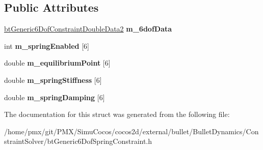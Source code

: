 \subsection*{Public Attributes}
\begin{DoxyCompactItemize}
\item 
\mbox{\label{structbtGeneric6DofSpringConstraintDoubleData2_ace84f798837107c558c2055a3c54be55}} 
\hyperlink{structbtGeneric6DofConstraintDoubleData2}{bt\+Generic6\+Dof\+Constraint\+Double\+Data2} {\bfseries m\+\_\+6dof\+Data}
\item 
\mbox{\label{structbtGeneric6DofSpringConstraintDoubleData2_a3529866fc6f122c6792bdae63099858e}} 
int {\bfseries m\+\_\+spring\+Enabled} \mbox{[}6\mbox{]}
\item 
\mbox{\label{structbtGeneric6DofSpringConstraintDoubleData2_a12e4a7d861f3322fd0dcbcdeda8d6713}} 
double {\bfseries m\+\_\+equilibrium\+Point} \mbox{[}6\mbox{]}
\item 
\mbox{\label{structbtGeneric6DofSpringConstraintDoubleData2_a6993e62c9cc68ba35efbf68ceef4d18d}} 
double {\bfseries m\+\_\+spring\+Stiffness} \mbox{[}6\mbox{]}
\item 
\mbox{\label{structbtGeneric6DofSpringConstraintDoubleData2_a17b526166fccc8fa85a2d6859daf4ddc}} 
double {\bfseries m\+\_\+spring\+Damping} \mbox{[}6\mbox{]}
\end{DoxyCompactItemize}


The documentation for this struct was generated from the following file\+:\begin{DoxyCompactItemize}
\item 
/home/pmx/git/\+P\+M\+X/\+Simu\+Cocos/cocos2d/external/bullet/\+Bullet\+Dynamics/\+Constraint\+Solver/bt\+Generic6\+Dof\+Spring\+Constraint.\+h\end{DoxyCompactItemize}

